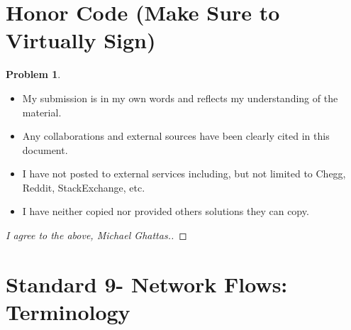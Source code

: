 \documentclass[11pt]{article}
\theoremstyle{definition}
\theoremstyle{definition}
\newtheorem{required}{Problem}
\theoremstyle{definition}
\begin{document}
\section{Honor Code (Make Sure to Virtually Sign)} \label{HonorCode}

\begin{required}
\begin{itemize}
\item My submission is in my own words and reflects my understanding of the material.
\item Any collaborations and external sources have been clearly cited in this document.
\item I have not posted to external services including, but not limited to Chegg, Reddit, StackExchange, etc.
\item I have neither copied nor provided others solutions they can copy.
\end{itemize}

\end{required}

\begin{proof}[I agree to the above, Michael Ghattas.]
\end{proof}




\newpage
\section{Standard 9- Network Flows: Terminology}
\end{document}
